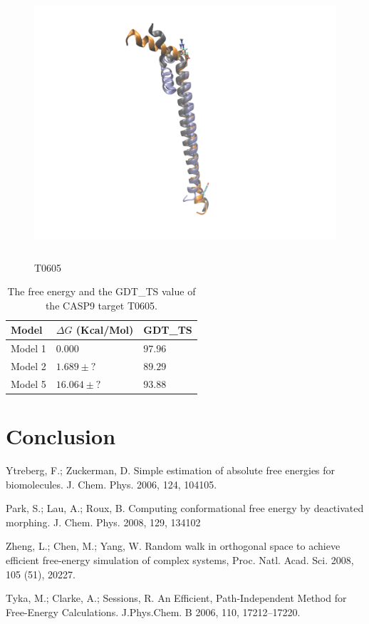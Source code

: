 \documentclass[12pt]{article}
\begin{document}
\begin{figure}
\begin{center}
\includegraphics[width=12cm,height=10cm]{T0605.pdf}
\end{center}
\caption{T0605}
\label{fig:T0605}
\end{figure}


\begin{table}
\caption{The free energy and the GDT\_TS value of the CASP9 target T0605.}
\label{tab:T0605}
\begin{center}
\begin{tabular}{l l l}\hline
Model   &     $\Delta G$ (Kcal/Mol) &  GDT\_TS \\ \hline
Model 1 &     $0.000$ &  $97.96$    \\
Model 2 &     $1.689 \pm ?$ &  $89.29$    \\
Model 5 &     $16.064 \pm ?$ & $93.88$   \\ \hline
\end{tabular}
\end{center}
\end{table}



\section{Conclusion}






Ytreberg, F.; Zuckerman, D. Simple estimation of absolute free energies for biomolecules. J. Chem. Phys. 2006, 124, 104105.

Park, S.; Lau, A.; Roux, B. Computing conformational free energy by deactivated morphing. J. Chem. Phys. 2008, 129, 134102

Zheng, L.; Chen, M.; Yang, W. Random walk in orthogonal space to achieve efficient free-energy simulation of complex systems, Proc. Natl. Acad. Sci. 2008, 105 (51), 20227.

Tyka, M.; Clarke, A.; Sessions, R. An Efficient, Path-Independent Method for Free-Energy Calculations. J.Phys.Chem. B 2006, 110, 17212–17220.
\end{document}
